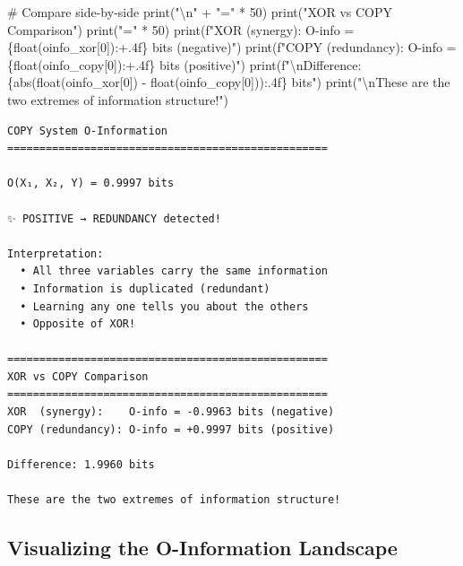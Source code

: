 \documentclass[
  11pt,
  letterpaper,
  oneside,
  openany]{book}
\newenvironment{Shaded}{\begin{snugshade}}{\end{snugshade}}
\newcommand{\BuiltInTok}[1]{\textcolor[rgb]{0.00,0.23,0.31}{#1}}
\newcommand{\CharTok}[1]{\textcolor[rgb]{0.13,0.47,0.30}{#1}}
\newcommand{\CommentTok}[1]{\textcolor[rgb]{0.37,0.37,0.37}{#1}}
\newcommand{\DecValTok}[1]{\textcolor[rgb]{0.68,0.00,0.00}{#1}}
\newcommand{\NormalTok}[1]{\textcolor[rgb]{0.00,0.23,0.31}{#1}}
\newcommand{\OperatorTok}[1]{\textcolor[rgb]{0.37,0.37,0.37}{#1}}
\newcommand{\SpecialCharTok}[1]{\textcolor[rgb]{0.37,0.37,0.37}{#1}}
\newcommand{\SpecialStringTok}[1]{\textcolor[rgb]{0.13,0.47,0.30}{#1}}
\newcommand{\StringTok}[1]{\textcolor[rgb]{0.13,0.47,0.30}{#1}}
\begin{document}
\begin{Shaded}
\begin{Highlighting}[]
\CommentTok{\# Compare side{-}by{-}side}
\BuiltInTok{print}\NormalTok{(}\StringTok{"}\CharTok{\textbackslash{}n}\StringTok{"} \OperatorTok{+} \StringTok{"="} \OperatorTok{*} \DecValTok{50}\NormalTok{)}
\BuiltInTok{print}\NormalTok{(}\StringTok{"XOR vs COPY Comparison"}\NormalTok{)}
\BuiltInTok{print}\NormalTok{(}\StringTok{"="} \OperatorTok{*} \DecValTok{50}\NormalTok{)}
\BuiltInTok{print}\NormalTok{(}\SpecialStringTok{f"XOR  (synergy):    O{-}info = }\SpecialCharTok{\{}\BuiltInTok{float}\NormalTok{(oinfo\_xor[}\DecValTok{0}\NormalTok{])}\SpecialCharTok{:+.4f\}}\SpecialStringTok{ bits (negative)"}\NormalTok{)}
\BuiltInTok{print}\NormalTok{(}\SpecialStringTok{f"COPY (redundancy): O{-}info = }\SpecialCharTok{\{}\BuiltInTok{float}\NormalTok{(oinfo\_copy[}\DecValTok{0}\NormalTok{])}\SpecialCharTok{:+.4f\}}\SpecialStringTok{ bits (positive)"}\NormalTok{)}
\BuiltInTok{print}\NormalTok{(}\SpecialStringTok{f"}\CharTok{\textbackslash{}n}\SpecialStringTok{Difference: }\SpecialCharTok{\{}\BuiltInTok{abs}\NormalTok{(}\BuiltInTok{float}\NormalTok{(oinfo\_xor[}\DecValTok{0}\NormalTok{]) }\OperatorTok{{-}} \BuiltInTok{float}\NormalTok{(oinfo\_copy[}\DecValTok{0}\NormalTok{]))}\SpecialCharTok{:.4f\}}\SpecialStringTok{ bits"}\NormalTok{)}
\BuiltInTok{print}\NormalTok{(}\StringTok{"}\CharTok{\textbackslash{}n}\StringTok{These are the two extremes of information structure!"}\NormalTok{)}
\end{Highlighting}
\end{Shaded}

\begin{verbatim}
COPY System O-Information
==================================================

O(X₁, X₂, Y) = 0.9997 bits

✨ POSITIVE → REDUNDANCY detected!

Interpretation:
  • All three variables carry the same information
  • Information is duplicated (redundant)
  • Learning any one tells you about the others
  • Opposite of XOR!

==================================================
XOR vs COPY Comparison
==================================================
XOR  (synergy):    O-info = -0.9963 bits (negative)
COPY (redundancy): O-info = +0.9997 bits (positive)

Difference: 1.9960 bits

These are the two extremes of information structure!
\end{verbatim}

\subsection{Visualizing the O-Information
Landscape}\label{visualizing-the-o-information-landscape}
\end{document}

